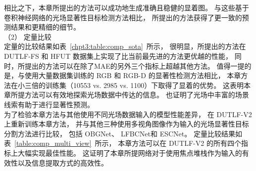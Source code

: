 相比之下，本章所提出的方法可以成功地生成准确且稳健的显着图。
与这些基于卷积神经网络的光场显著性目标检测方法相比，
所提出的方法获得了更一致的预测结果和更精细的细节。
\\
%
%
%
%
\indent
（2）
定量比较
\\
%
%
%
%
\indent
定量的比较结果如表~\ref{chpt3:table:comp_sota}~所示，
很明显，所提出的方法在 DUTLF-FS 和 HFUT 数据集上实现了比当前最先进的方法更优越的性能，
同时，所提出的方法可以在除了MAE的另外三个指标上超越其他方法。 
值得一提的是，与使用大量数据集训练的 RGB 和 RGB-D 的显著性检测方法相比，
本章方法在小三倍的训练集（10553 vs. 2985 vs. 1100）下取得了显着的优势。 
这表明本章所提方法可以有效地探索光场数据中传达的信息。 
也证明了光场中丰富的场景线索有助于进行显著性预测。
\\
%
%
%
%
\indent
为了检验本章方法与其他使用不同光场数据输入的模型性能差异，
在 DUTLF-V2 上重新训练本章方法，
并与其他三种使用多视角图像作为输入的光场显著性目标分割方法进行比较，
包括 OBGNet、
LFBCNet和
ESCNet。 
定量比较结果如表~\ref{table:comp_multi_view}~所示，
本章方法可以在 DUTLF-V2 的所有四个指标上大幅实现最佳性能。 
这证明了本章所提网络对于使用焦点堆栈作为输入的有效性以及信息提取方式的高效性。 
